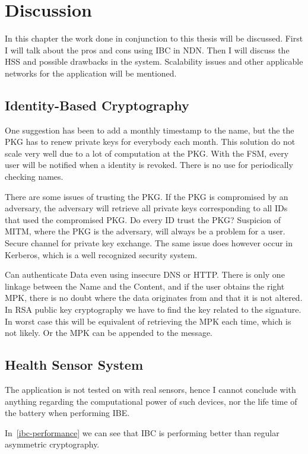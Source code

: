 \chapter{Discussion}
In this chapter the work done in conjunction to this thesis will be discussed. 
First I will talk about the pros and cons using \gls{IBC} in \gls{NDN}.
Then I will discuss the \gls{HSS} and possible drawbacks in the system. 
Scalability issues and other applicable networks for the application will be mentioned.

\section{Identity-Based Cryptography}
One suggestion has been to add a monthly timestamp to the name, but the the \gls{PKG} has to renew private keys for everybody each month. 
This solution do not scale very well due to a lot of computation at the \gls{PKG}.
With the \gls{FSM}, every user will be notified when a identity is revoked.
There is no use for periodically checking names.

There are some issues of trusting the \gls{PKG}. 
If the \gls{PKG} is compromised by an adversary, the adversary will retrieve all private keys corresponding to all IDs that used the compromised \gls{PKG}. 
Do every ID trust the \gls{PKG}? Suspicion of \gls{MITM}, where the \gls{PKG} is the adversary, will always be a problem for a user.
Secure channel for private key exchange. 
The same issue does however occur in Kerberos, which is a well recognized security system. 

Can authenticate Data even using insecure DNS or HTTP. 
There is only one linkage between the Name and the Content, and if the user obtains the right \gls{MPK}, there is no doubt where the data originates from and that it is not altered.
In RSA public key cryptography we have to find the key related to the signature. 
In worst case this will be equivalent of retrieving the \gls{MPK} each time, which is not likely. 
Or the \gls{MPK} can be appended to the message.

\section{Health Sensor System}
The application is not tested on with real sensors, hence I cannot conclude with anything regarding the computational power of such devices, nor the life time of the battery when performing \gls{IBE}.  

In~\autoref{ibc-performance} we can see that \gls{IBC} is performing better than regular asymmetric cryptography. 

